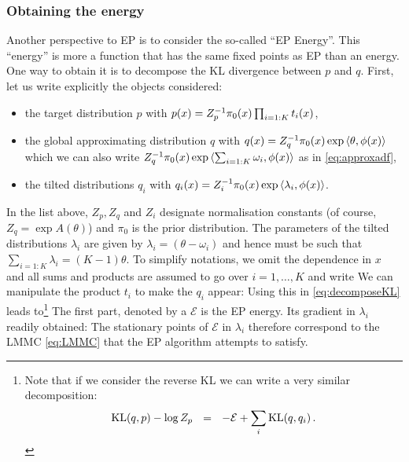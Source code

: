 \subsubsection*{Obtaining the energy}
Another perspective to EP is to consider the so-called ``EP Energy''. This ``energy'' is more a function that has the same fixed points as EP than an energy. One way to obtain it is to decompose the KL divergence between $p$ and $q$. First, let us write explicitly the objects considered:
\begin{itemize}
	\item the target distribution $p$ with $p(x)=Z_p^{-1} \pi_0(x)\prod_{i=1:K}t_i(x)$,
	\item the global approximating distribution $q$ with $q(x)=Z_q^{-1} \pi_0(x)\exp\left\langle \theta,\phi(x) \right\rangle$ which we can also write $Z_q^{-1} \pi_0(x)\exp\left\langle \sum_{i=1:K}\omega_i,\phi(x) \right\rangle$ as in \eqref{eq:approxadf},
	\item the tilted distributions $q_i$ with $q_i(x)=Z_i^{-1} \pi_0(x)\exp\left\langle \lambda_i,\phi(x) \right\rangle$.
\end{itemize}
In the list above, $Z_p,Z_q$ and $Z_i$ designate normalisation constants (of course, $Z_q=\exp A(\theta)$) and $\pi_0$ is the prior distribution. The parameters of the tilted distributions $\lambda_i$ are given by $\lambda_i=(\theta-\omega_i)$ and hence must be such that $\sum_{i=1:K}\lambda_i=(K-1)\theta$. To simplify notations, we omit the dependence in $x$ and all sums and products are assumed to go over $i=1,\dots,K$ and write
%
%	
We can manipulate the product $t_i$ to make the $q_i$ appear:
%
%
Using this in \eqref{eq:decomposeKL} leads to\footnote{Note that if we consider the reverse KL we can write a very similar decomposition:
\[\mathrm{KL}\!\left(q,p\right) - \log Z_p \quad\!\!=\quad\!\! -\mathcal E + \sum_i \mathrm{KL}\!\left(q,q_i\right).\]}
%
%
The first part, denoted by a $\mathcal E$ is the EP energy. Its gradient in $\lambda_i$ readily obtained:
%
%
The stationary points of $\mathcal E$ in $\lambda_i$ therefore correspond to the LMMC \eqref{eq:LMMC} that the EP algorithm attempts to satisfy.
